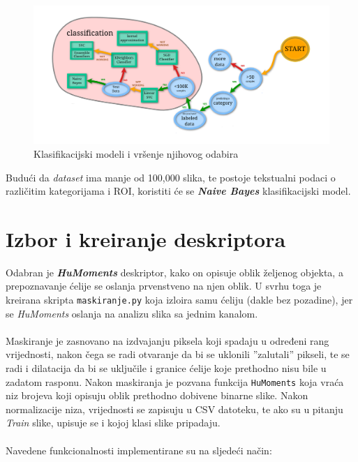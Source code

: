 \documentclass[12pt,a4paper]{article}
\begin{document}
\begin{figure}[H]

\center
\includegraphics[scale=0.35]{slikaModeli.png}
\caption{Klasifikacijski modeli i vršenje njihovog odabira}
	
\end{figure}

Budući da \textit{dataset} ima manje od 100,000 slika, te postoje tekstualni podaci o različitim kategorijama i ROI, koristiti će se \textbf{\textit{Naive Bayes}} klasifikacijski model.

\newpage

\section{Izbor i kreiranje deskriptora}

Odabran je \textbf{\textit{HuMoments}} deskriptor, kako on opisuje oblik željenog objekta, a prepoznavanje ćelije se oslanja prvenstveno na njen oblik. U svrhu toga je kreirana skripta  \texttt{maskiranje.py} koja izloira samu ćeliju (dakle bez pozadine), jer se \textit{HuMoments} oslanja na analizu slika sa jednim kanalom.\\
~\\
Maskiranje je zasnovano na izdvajanju piksela koji spadaju u određeni rang vrijednosti, nakon čega se radi otvaranje da bi se uklonili ''zalutali'' pikseli, te se radi i dilatacija da bi se uključile i granice ćelije koje prethodno nisu bile u zadatom rasponu. Nakon maskiranja je pozvana funkcija \texttt{HuMoments} koja vraća niz brojeva koji opisuju oblik prethodno dobivene binarne slike. Nakon normalizacije niza, vrijednosti se zapisuju u CSV datoteku, te ako su u pitanju \textit{Train} slike, upisuje se i kojoj klasi slike pripadaju.\\
~\\
Navedene funkcionalnosti implementirane su na sljedeći način:\\
\end{document}
